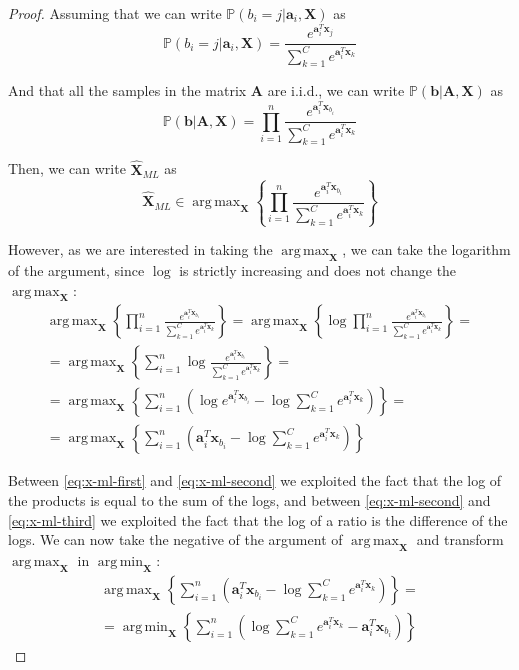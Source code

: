 \documentclass[12pt]{article}
\DeclareMathOperator*{\argmax}{arg\,max}
\DeclareMathOperator*{\argmin}{arg\,min}
\newcommand{\expax}{e^{\mathbf{a}_{i}^T\mathbf{x}_{b_{i}}}}
\newcommand{\expaxj}{e^{\mathbf{a}_{i}^T\mathbf{x}_j}}
\newcommand{\expaxsum}{\sum_{k=1}^{C} e^{\mathbf{a}_{i}^T\mathbf{x}_k}}
\newcommand{\boldX}{\mathbf{X}}
\begin{document}
\begin{proof}
Assuming that we can write $\mathbb{P}(b_{i} = j | \mathbf{a}_{i}, \mathbf{X})$ as
\begin{equation}
    \mathbb{P}(b_{i} = j | \mathbf{a}_{i}, \mathbf{X}) = \frac{\expaxj}{\expaxsum}
\end{equation}

And that all the samples in the matrix $\mathbf{A}$ are i.i.d., we can write $\mathbb{P}(\mathbf{b} | \mathbf{A}, \mathbf{X})$ as
\begin{equation}
    \mathbb{P}(\mathbf{b} | \mathbf{A}, \mathbf{X}) = \prod_{i=1}^n \frac{\expax}{\expaxsum}
\end{equation}

Then, we can write $\hat{\boldX}_{ML}$ as
\begin{equation}
    \hat{\boldX}_{ML} \in \argmax_{\boldX} \left \{ \prod_{i=1}^n \frac{\expax}{\expaxsum} \right\}
\end{equation}

However, as we are interested in taking the $\argmax_{\boldX}$, we can take the logarithm of the argument, since $\log$ is strictly increasing and does not change the $\argmax_{\boldX}$:
\begin{gather}
    \argmax_{\boldX} \left \{ \prod_{i=1}^n \frac{\expax}{\expaxsum} \right\}
    = \argmax_{\boldX} \left \{ \log \prod_{i=1}^n \frac{\expax}{\expaxsum} \right\} = \label{eq:x-ml-first} \\
    = \argmax_{\boldX} \left \{ \sum_{i=1}^n \log \frac{\expax}{\expaxsum} \right\} = \label{eq:x-ml-second} \\
    = \argmax_{\boldX} \left \{ \sum_{i=1}^n \left ( \log \expax - \log \expaxsum \right ) \right\} = \label{eq:x-ml-third} \\
    = \argmax_{\boldX} \left \{ \sum_{i=1}^n \left ( \mathbf{a}_{i}^T\mathbf{x}_{b_{i}} - \log \expaxsum \right ) \right\}
\end{gather}

Between \eqref{eq:x-ml-first} and \eqref{eq:x-ml-second} we exploited the fact that the log of the products is equal to the sum of the logs, and between \eqref{eq:x-ml-second} and \eqref{eq:x-ml-third} we exploited the fact that the log of a ratio is the difference of the logs. We can now take the negative of the argument of $\argmax_{\boldX}$ and transform $\argmax_{\boldX}$ in $\argmin_{\boldX}$:
\begin{gather}
    \argmax_{\boldX} \left \{ \sum_{i=1}^n \left ( \mathbf{a}_{i}^T\mathbf{x}_{b_{i}} - \log \expaxsum \right ) \right\} = \\
    = \argmin_{\boldX} \left \{ \sum_{i=1}^n \left (\log \expaxsum - \mathbf{a}_{i}^T\mathbf{x}_{b_{i}} \right ) \right\}
\end{gather}


\end{proof}
\end{document}
